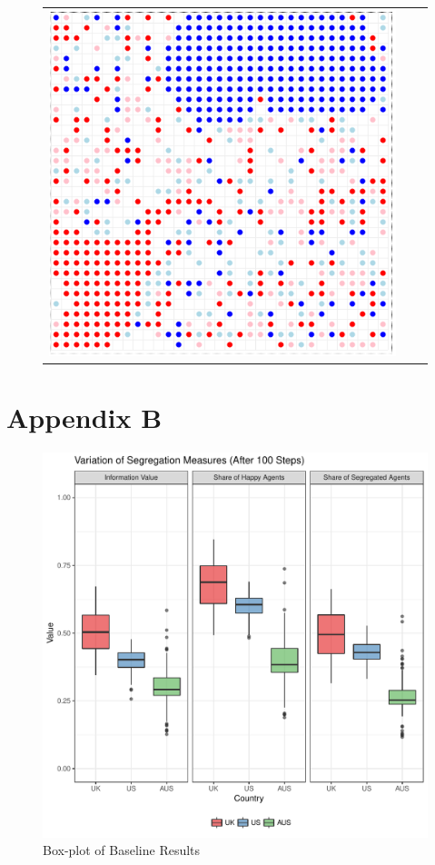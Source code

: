 \documentclass[12pt, a4paper]{article}
\begin{document}
\begin{figure}[H]
\begin{tabular}{ccc}
			\includegraphics[scale=0.35]{Plots/AUS_step50.PNG} \\
		\end{tabular}
	\end{figure}

	\section*{Appendix B}
		\begin{figure}[H]
		\centering
		\caption{Box-plot of Baseline Results}
		\includegraphics[scale=0.6]{./Plots/box_plot_agg.pdf}
	\end{figure}
	
\end{document}

